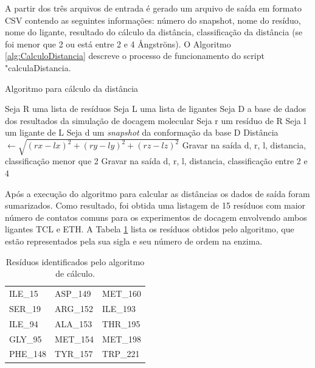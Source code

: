 % 
%
%       

A partir dos três arquivos de entrada é gerado um arquivo de saída em formato CSV contendo as seguintes informações: número do snapshot, nome do resíduo, nome do ligante, resultado do cálculo da distância, classificação da distância (se foi menor que 2 ou está entre 2 e 4 {\AA}ngstr\"ons).
O Algoritmo \ref{alg:CalculoDistancia} descreve o processo de funcionamento do script "calculaDistancia.

\begin{algorithm}[H]
\caption{Algoritmo para cálculo da distância}
\label{alg:CalculoDistancia}
{\fontsize{10}{10}\selectfont
\begin{algorithmic}[1]
	\STATE Seja R uma lista de resíduos
	\STATE Seja L uma lista de ligantes
	\STATE Seja D a base de dados dos resultados da simulação de docagem molecular
	\STATE Seja r um resíduo de R
	\STATE Seja l um ligante de L
	\STATE Seja d um \emph{snapshot} da conformação da base D
			\STATE Distância $\gets \sqrt{(rx - lx)^{2} +(ry - ly)^{2} + (rz - lz)^{2}}$ 
			\ENDIF
				\STATE Gravar na saída d, r, l, distancia, classificação menor que 2
				\ELSE
				\STATE Gravar na saída d, r, l, distancia, classificação entre 2 e 4
				\ENDIF
			\ENDIF
			\ENDFOR
		\ENDFOR
	\ENDFOR
\end{algorithmic}
}
\end{algorithm}

% 
%
%       

Após a execução do algoritmo para calcular as distâncias os dados de saída foram sumarizados. Como resultado, foi obtida uma listagem de 15 resíduos com maior número de contatos comuns para os experimentos de docagem envolvendo ambos ligantes TCL e ETH. A Tabela \ref{tab:listaProvavelRelevantes} lista os resíduos obtidos pelo algoritmo, que estão representados pela sua sigla e seu número de ordem na enzima.

\begin{table}[h]
	\caption{Resíduos identificados pelo algoritmo de cálculo.}
	\label{tab:listaProvavelRelevantes}
	\centering
	\begin{tabular}{@{}lll@{}}
	ILE\_15  & ASP\_149 & MET\_160 \\
	SER\_19  & ARG\_152 & ILE\_193 \\
	ILE\_94  & ALA\_153 & THR\_195 \\
	GLY\_95  & MET\_154 & MET\_198 \\
	PHE\_148 & TYR\_157 & TRP\_221 \\
	\end{tabular}
\end{table}

